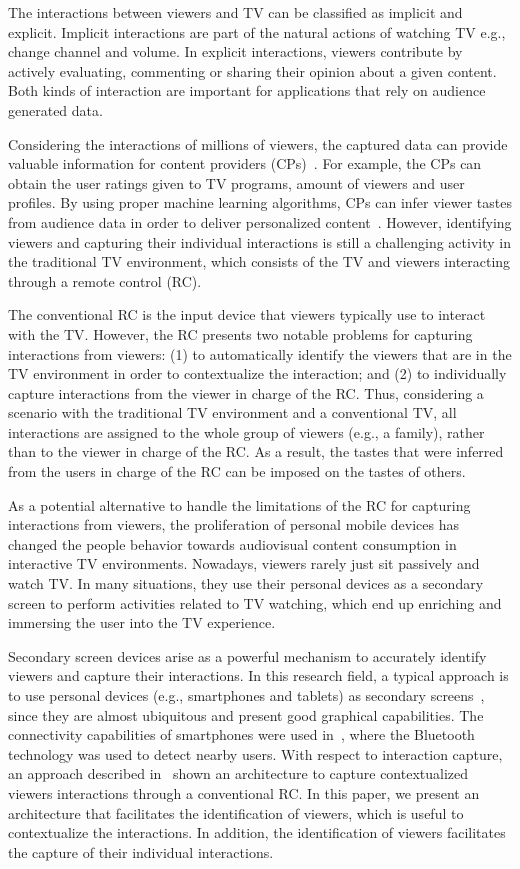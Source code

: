 \documentclass[conference,a4paper]{IEEEtran}
\begin{document}
The interactions between viewers and TV can be classified as implicit and explicit. Implicit interactions are part of the natural actions of watching TV e.g., change channel and volume. In explicit interactions, viewers contribute by actively evaluating, commenting or sharing their opinion about a given content. Both kinds of interaction are important for applications that rely on audience generated data.

Considering the interactions of millions of viewers, the captured data can provide valuable information for content providers (CPs)~\cite{Teixeira2010}. For example, the CPs can obtain the user ratings given to TV programs, amount of viewers and user profiles. By using proper machine learning algorithms, CPs can infer viewer tastes from audience data in order to deliver personalized content~\cite{Kim2012,Shin2009}. However, identifying viewers and capturing their individual interactions is still a challenging activity in the traditional TV environment, which consists of the TV and viewers interacting through a remote control (RC).

The conventional RC is the input device that viewers typically use to interact with the TV. However, the RC presents two notable problems for capturing interactions from viewers: (1) to automatically identify the viewers that are in the TV environment in order to contextualize the interaction; and (2) to individually capture interactions from the viewer in charge of the RC. Thus, considering a scenario with the traditional TV environment and a conventional TV, all interactions are assigned to the whole group of viewers (e.g., a family), rather than to the viewer in charge of the RC. As a result, the tastes that were inferred from the users in charge of the RC can be imposed on the tastes of others.

As a potential alternative to handle the limitations of the RC for capturing interactions from viewers, the proliferation of personal mobile devices has changed the people behavior towards audiovisual content consumption in interactive TV environments. Nowadays, viewers rarely just sit passively and watch TV. In many situations, they use their personal devices as a secondary screen to perform activities related to TV watching, which end up enriching and immersing the user into the TV experience. 

Secondary screen devices arise as a powerful mechanism to accurately identify viewers and  capture their interactions. In this research field, a typical approach is to use personal devices (e.g., smartphones and tablets) as secondary screens~\cite{Courtois2012}, since they are almost ubiquitous and present good graphical capabilities. The connectivity capabilities of smartphones were used in~\cite{Cabarcos2011}, where the Bluetooth technology was used to detect nearby users. With respect to interaction capture, an approach described in~\cite{Teixeira2010} shown an architecture to capture contextualized viewers interactions through a conventional RC. In this paper, we present an architecture that facilitates the identification of viewers, which is useful to contextualize the interactions. In addition, the identification of viewers facilitates the capture of their individual interactions.
\end{document}
